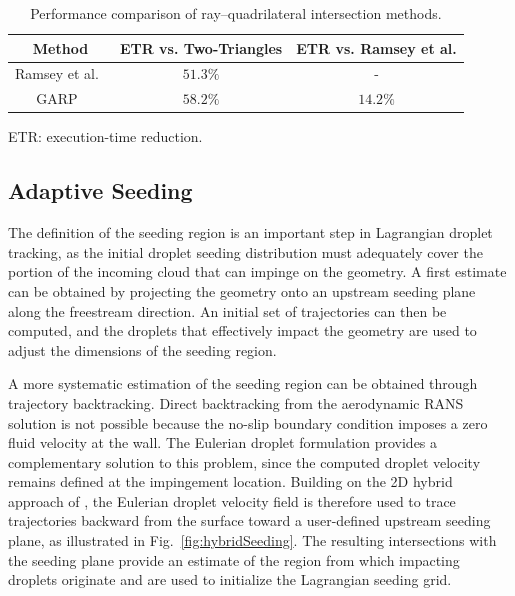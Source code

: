 \begin{table}[htb!]
\centering
\begin{threeparttable}
\caption{Performance comparison of ray--quadrilateral intersection methods.}
\label{tab:quad_intersections}

\begin{tabular}{ccc}
\hline \hline
\textbf{Method} &
\textbf{ETR\tnote{*} vs. Two-Triangles \cite{M_ller_1997}} &
\textbf{ETR\tnote{*} vs. Ramsey et al.\cite{Ramsey_2004}} \\
\hline
Ramsey et al.~\cite{Ramsey_2004} & $51.3\%$ & - \\
GARP~\cite{Reshetov_2019} & $58.2\%$ & $14.2\%$ \\
\hline \hline
\end{tabular}

\begin{tablenotes}[flushleft]
\footnotesize
\item[*] ETR: execution-time reduction.
\end{tablenotes}

\end{threeparttable}
\end{table}

\subsection{Adaptive Seeding}

The definition of the seeding region is an important step in Lagrangian droplet tracking, as the initial droplet seeding distribution must adequately cover the portion of the incoming cloud that can impinge on the geometry. A first estimate can be obtained by projecting the geometry onto an upstream seeding plane along the freestream direction. An initial set of trajectories can then be computed, and the droplets that effectively impact the geometry are used to adjust the dimensions of the seeding region.

A more systematic estimation of the seeding region can be obtained through trajectory backtracking. Direct backtracking from the aerodynamic RANS solution is not possible because the no-slip boundary condition imposes a zero fluid velocity at the wall. The Eulerian droplet formulation provides a complementary solution to this problem, since the computed droplet velocity remains defined at the impingement location. Building on the 2D hybrid approach of \cite{papillon2022stochastic}, the Eulerian droplet velocity field is therefore used to trace trajectories backward from the surface toward a user-defined upstream seeding plane, as illustrated in Fig.~\ref{fig:hybridSeeding}. The resulting intersections with the seeding plane provide an estimate of the region from which impacting droplets originate and are used to initialize the Lagrangian seeding grid.

